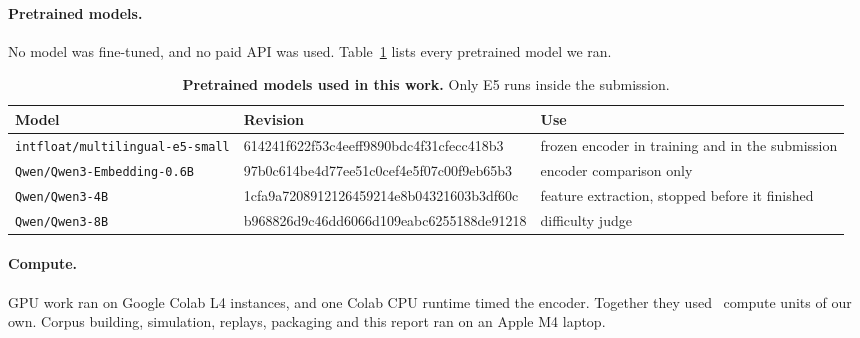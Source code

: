 \documentclass{article}
\begin{document}
\paragraph{Pretrained models.} No model was fine-tuned, and no paid API was used. Table~\ref{tab:models} lists every pretrained model we ran.
\begin{table}[ht]
\centering
\caption{\textbf{Pretrained models used in this work.} Only E5 runs inside the submission.}
\label{tab:models}
\footnotesize
\begin{tabular}{l>{\scriptsize\ttfamily}l>{\raggedright\arraybackslash}p{2.7cm}}
\toprule
Model & \normalfont\footnotesize Revision & Use \\
\midrule
\texttt{intfloat/multilingual-e5-small} & 614241f622f53c4eeff9890bdc4f31cfecc418b3 & frozen encoder in training and in the submission \\
\texttt{Qwen/Qwen3-Embedding-0.6B} & 97b0c614be4d77ee51c0cef4e5f07c00f9eb65b3 & encoder comparison only \\
\texttt{Qwen/Qwen3-4B} & 1cfa9a7208912126459214e8b04321603b3df60c & feature extraction, stopped before it finished \\
\texttt{Qwen/Qwen3-8B} & b968826d9c46dd6066d109eabc6255188de91218 & difficulty judge \\
\bottomrule
\end{tabular}
\end{table}
\paragraph{Compute.} GPU work ran on Google Colab L4 instances, and one Colab CPU runtime timed the encoder. Together they used \ColabUnits\ compute units of our own. Corpus building, simulation, replays, packaging and this report ran on an Apple M4 laptop.
\end{document}
